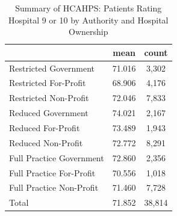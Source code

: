 \begin{table}[htbp]\centering
\def\sym#1{\ifmmode^{#1}\else\(^{#1}\)\fi}
\caption{Summary of HCAHPS: Patients Rating Hospital 9 or 10 by Authority and Hospital Ownership}
\begin{tabular}{l*{1}{cc}}
\toprule
                    &        mean&       count\\
\midrule
Restricted Government&      71.016&       3,302\\
Restricted For-Profit&      68.906&       4,176\\
Restricted Non-Profit&      72.046&       7,833\\
Reduced Government  &      74.021&       2,167\\
Reduced For-Profit  &      73.489&       1,943\\
Reduced Non-Profit  &      72.772&       8,291\\
Full Practice Government&      72.860&       2,356\\
Full Practice For-Profit&      70.556&       1,018\\
Full Practice Non-Profit&      71.460&       7,728\\
Total               &      71.852&      38,814\\
\bottomrule
\end{tabular}
\end{table}
